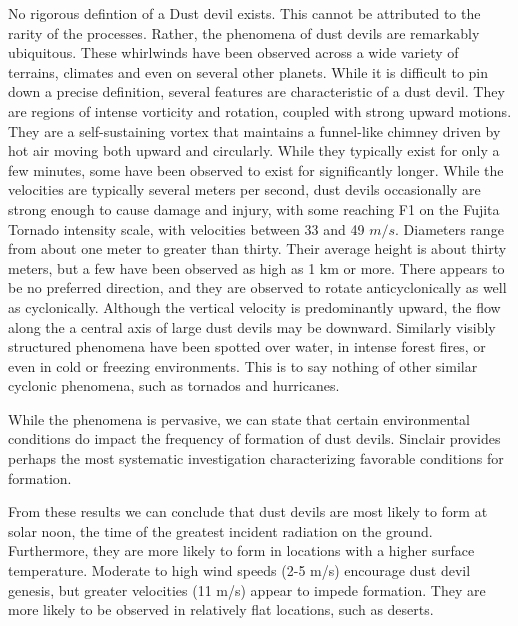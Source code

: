 No rigorous defintion of a Dust devil exists. This cannot be attributed
to the rarity of the processes. Rather, the phenomena of dust devils are
remarkably ubiquitous. These whirlwinds have been
observed across a wide variety of terrains, climates and even on several
other planets\cite{Sinclair1969,Bluestein2004,JGR:JGR13978,JGRE:JGRE1660}. 
While it is difficult to pin down a precise definition, several features 
are characteristic of a dust devil. They are regions of
intense vorticity and rotation, coupled with strong upward motions. 
They are a self-sustaining vortex that maintains a funnel-like
chimney driven by hot air moving both upward and circularly. 
While they typically exist for only a few minutes, some have 
been observed to exist for significantly longer. While the velocities are 
typically several meters per second, 
%
%
dust devils occasionally are strong enough to cause damage and injury,
with some reaching F1 on the Fujita Tornado intensity scale, with velocities 
between 33 and 49 $m/s$.
%
%
Diameters range from about one meter to greater than thirty.  Their
average height is about thirty meters, but a few have been observed 
as high as 1 km or more. There appears to be no preferred direction, and
they are observed to rotate anticyclonically as well as
cyclonically. Although the vertical velocity 
is predominantly upward, the flow along the a central axis of large dust devils
may be downward. 
%
%
Similarly visibly structured phenomena have been spotted over water, in
intense forest fires, or even in cold or freezing environments. 
%
%
This is to say nothing of other similar cyclonic phenomena, such as
tornados and hurricanes. 

While the phenomena is pervasive, we can state that certain 
environmental conditions do impact the frequency of formation
of dust devils. Sinclair\cite{Sinclair1969} provides perhaps the most 
systematic investigation characterizing favorable conditions for formation. 

From these results we can conclude that dust devils are most likely 
to form at solar noon, the time of the greatest incident radiation 
on the ground. Furthermore, they are more likely to form in locations 
with a higher surface temperature. 
Moderate to high wind speeds (2-5 m/s) encourage dust 
devil genesis, but greater velocities (11 m/s) appear to impede formation. 
They are more likely to be observed in relatively flat locations, 
such as deserts. 

